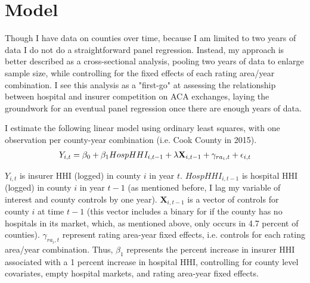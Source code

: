 \documentclass[12pt,letterpaper]{article}
\begin{document}
\section{Model}

Though I have data on counties over time, because I am limited to two years of data I do not do a straightforward panel regression. Instead, my approach is better described as a cross-sectional analysis, pooling two years of data to enlarge sample size, while controlling for the fixed effects of each rating area/year combination. I see this analysis as a "first-go" at assessing the relationship between hospital and insurer competition on ACA exchanges, laying the groundwork for an eventual panel regression once there are enough years of data.

I estimate the following linear model using ordinary least squares, with one observation per county-year combination (i.e. Cook County in 2015).
\\
\begingroup
{}
\vspace{-1.5cm}
\begin{equation}
\makebox[\textwidth]{%
$\begin{aligned}
Y_{i,t} = \beta_0 + \beta_1HospHHI_{i,t-1} +
\lambda\textbf{X}_{i,t-1} + \gamma_{ra_i, t} + \epsilon_{i,t} \notag \end{aligned}$}
\end{equation} 
\endgroup

$Y_{i,t}$ is insurer HHI (logged) in county $i$ in year $t$. $HospHHI_{i, t-1}$ is hospital HHI (logged) in county $i$ in year $t-1$ (as mentioned before, I lag my variable of interest and county controls by one year). $\textbf{X}_{i, t-1}$ is a vector of controls for county $i$ at time $t-1$ (this vector includes a binary for if the county has no hospitals in its market, which, as mentioned above, only occurs in 4.7 percent of counties). $\gamma_{ra_i, t}$ represent rating area-year fixed effects, i.e. controls for each rating area/year combination. Thus, $\beta_1$ represents the percent increase in insurer HHI associated with a 1 percent increase in hospital HHI, controlling for county level covariates, empty hospital markets, and rating area-year fixed effects.
\end{document}
